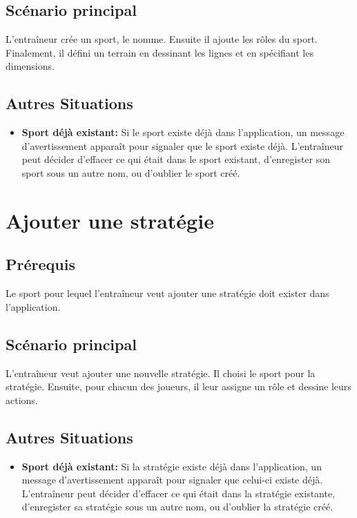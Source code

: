 \subsection{Sc\'enario principal}
\label{sub:sc'enario_principal}

L'entra\^ineur cr\'ee un sport, le nomme.
Ensuite il ajoute les r\^oles du sport.
Finalement, il d\'efini un terrain en dessinant les lignes et en sp\'ecifiant les dimensions.

\subsection{Autres Situations}
\label{sub:autres_situations}
\begin{itemize}
    \item \textbf{Sport d\'ej\`a existant:} Si le sport existe d\'ej\`a dans l'application, un message d'avertissement appara\^it pour signaler que le sport existe d\'ej\`a. 
    L'entraîneur peut d\'ecider d'effacer ce qui \'etait dans le sport existant, d'enregister son sport sous un autre nom, ou d'oublier le sport cr\'e\'e. 
\end{itemize}

\section{Ajouter une stratégie}
\label{sec:ajouter_une_strategie}

\subsection{Pr\'erequis}
\label{sub:prerequis}

Le sport pour lequel l'entraîneur veut ajouter une stratégie doit exister dans l'application.

\subsection{Sc\'enario principal}
\label{sub:sc'enario_principal}

L'entraîneur veut ajouter une nouvelle stratégie.
Il choisi le sport pour la strat\'egie.
Ensuite, pour chacun des joueurs, il leur assigne un r\^ole et dessine leurs actions.

\subsection{Autres Situations}
\label{sub:autres_situations}
\begin{itemize}
    \item \textbf{Sport d\'ej\`a existant:} Si la stratégie existe d\'ej\`a dans l'application, un message d'avertissement appara\^it pour signaler que celui-ci existe d\'ej\`a. 
    L'entraîneur peut d\'ecider d'effacer ce qui \'etait dans la stratégie existante, d'enregister sa stratégie sous un autre nom, ou d'oublier la stratégie cr\'e\'e. 
\end{itemize}

